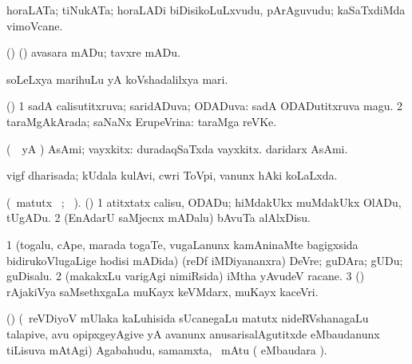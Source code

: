 \bentry
{}
\pron{}
\gl{\nA}
\bmng
horaLATa; tiNukATa; horaLADi biDisikoLuLxvudu, pArAguvudu; kaSaTxdiMda vimoVcane. 
\emng

\noindent 
\gl{\pagu}
\bmng
{} (\ame) (\ashi) avasara mADu; tavxre mADu. 
\emng
\eentry

\bentry 
{}
\gl{\nA}
\bmng
soLeLxya marihuLu yA koVshadalilxya mari. 
\emng
\eentry

\bentry
{} 
\gl{\gu}
\bmng
(\AmA) 
\bnum
\num{1} sadA calisutitxruva; saridADuva; ODADuva:  sadA ODADutitxruva magu. 
\num{2} taraMgAkArada; saNaNx ErupeVrina:  taraMga reVKe. 
\enum
\emng
\eentry

\bentry
{}
\gl{\nA}
\bmng
(\pArxparx\ \hA\ yA \pArxM) AsAmi; vayxkitx:  duradaqSaTxda vayxkitx.  daridarx AsAmi. 
\emng
\eentry

\bentry
{}
\gl{\gu}
\bmng
vigf dharisada; kUdala kulAvi, cwri ToVpi, \mo vanunx hAki koLaLxda. 
\emng
\eentry

\bentry
{}
\gl{\kirx} 
 (\BU\ matutx \BUkaq\ ; \vakaq\ ). 
\bmng
(\AmA) 
\bnum
\num{1} atitxtatx calisu, ODADu; hiMdakUkx muMdakUkx OlADu, tUgADu. 
\num{2} (EnAdarU saMjecnx mADalu) bAvuTa alAlxDisu. 
\enum
\emng
\eentry

\bentry
{}
\gl{\nA}
\bmng
\bnum
\num{1} (togalu, cApe, marada togaTe, \mo vugaLanunx kamAninaMte bagigxsida bidirukoVlugaLige hodisi mADida) (reDf iMDiyananxra) DeVre; guDAra; gUDu; guDisalu. 
\num{2} (makakxLu \mo varigAgi nimiRsida) iMtha yAvudeV racane. 
\num{3} (\ame) rAjakiVya saMsethxgaLa muKayx keVMdarx, muKayx kaceVri. 
\enum
\emng
\eentry

\bentry
{}
\gl{\BAavayx}
\bmng
(\AmA) (\kanmu\ reVDiyoV mUlaka kaLuhisida sUcanegaLu matutx nideRVshanagaLu talapive, avu opipxgeyAgive yA avanunx anusarisalAgutitxde eMbaudanunx tiLisuva mAtAgi) Agabahudu, samamxta, \mo\ mAtu ( eMbaudara \saMkiSx). 
\emng
\eentry

